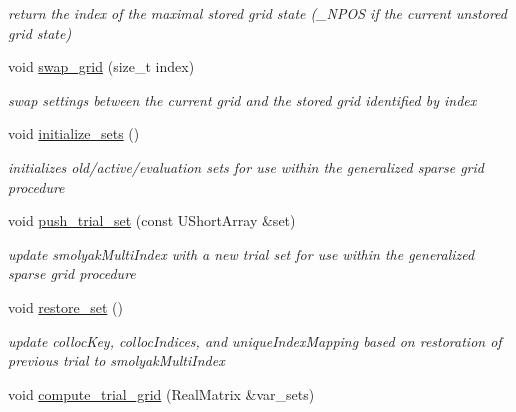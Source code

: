 \begin{DoxyCompactItemize}
\begin{DoxyCompactList}\small\item\em return the index of the maximal stored grid state (\+\_\+\+N\+P\+OS if the current unstored grid state) \end{DoxyCompactList}\item 
void \hyperlink{classPecos_1_1HierarchSparseGridDriver_ae42d43e21fe55d5b6cca7edf86e54818}{swap\+\_\+grid} (size\+\_\+t index)\label{classPecos_1_1HierarchSparseGridDriver_ae42d43e21fe55d5b6cca7edf86e54818}

\begin{DoxyCompactList}\small\item\em swap settings between the current grid and the stored grid identified by index \end{DoxyCompactList}\item 
void \hyperlink{classPecos_1_1HierarchSparseGridDriver_a059e9e1e03a5cd29771d369b76311261}{initialize\+\_\+sets} ()\label{classPecos_1_1HierarchSparseGridDriver_a059e9e1e03a5cd29771d369b76311261}

\begin{DoxyCompactList}\small\item\em initializes old/active/evaluation sets for use within the generalized sparse grid procedure \end{DoxyCompactList}\item 
void \hyperlink{classPecos_1_1HierarchSparseGridDriver_a99c17efb3a8e873b7708652cc1787370}{push\+\_\+trial\+\_\+set} (const U\+Short\+Array \&set)\label{classPecos_1_1HierarchSparseGridDriver_a99c17efb3a8e873b7708652cc1787370}

\begin{DoxyCompactList}\small\item\em update smolyak\+Multi\+Index with a new trial set for use within the generalized sparse grid procedure \end{DoxyCompactList}\item 
void \hyperlink{classPecos_1_1HierarchSparseGridDriver_ad9648693eacbe856825d2c78b73a3301}{restore\+\_\+set} ()\label{classPecos_1_1HierarchSparseGridDriver_ad9648693eacbe856825d2c78b73a3301}

\begin{DoxyCompactList}\small\item\em update colloc\+Key, colloc\+Indices, and unique\+Index\+Mapping based on restoration of previous trial to smolyak\+Multi\+Index \end{DoxyCompactList}\item 
void \hyperlink{classPecos_1_1HierarchSparseGridDriver_a392163a55c3c5c2b4357b5490009df62}{compute\+\_\+trial\+\_\+grid} (Real\+Matrix \&var\+\_\+sets)\label{classPecos_1_1HierarchSparseGridDriver_a392163a55c3c5c2b4357b5490009df62}


\end{DoxyCompactItemize}
